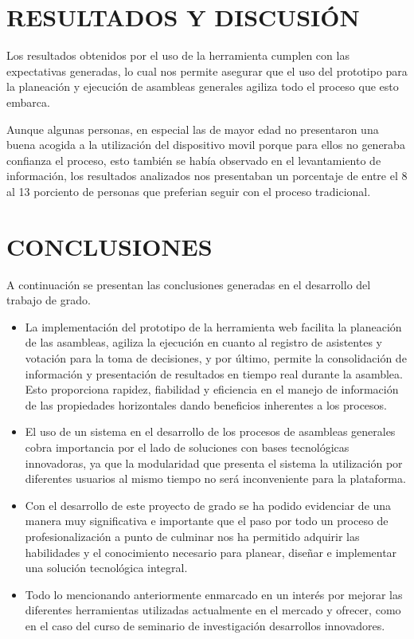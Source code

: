 \chapter{RESULTADOS Y DISCUSIÓN}

Los resultados obtenidos por el uso de la herramienta cumplen con las expectativas generadas, lo cual nos permite asegurar que el uso del prototipo para la planeación y ejecución de asambleas generales agiliza todo el proceso que esto embarca.

\vspace{0.5cm}

Aunque algunas personas, en especial las de mayor edad no presentaron una buena acogida a la utilización del dispositivo movil porque para ellos no generaba confianza el proceso, esto también se había observado en el levantamiento de información, los resultados analizados nos presentaban un porcentaje de entre el 8 al 13 porciento de personas que preferian seguir con el proceso tradicional.

\chapter{CONCLUSIONES}

A continuación se presentan las conclusiones generadas en el desarrollo del trabajo de grado.

\begin{itemize}
	\item La implementación del prototipo de la herramienta web facilita la planeación de las asambleas, agiliza la ejecución en cuanto al registro de asistentes y votación para la toma de decisiones, y por último, permite la consolidación de información y presentación de resultados en tiempo real durante la asamblea. Esto proporciona rapidez, fiabilidad y eficiencia en el manejo de información de las propiedades horizontales dando beneficios inherentes a los procesos.	
	\item El uso de un sistema en el desarrollo de los procesos de asambleas generales cobra importancia por el lado de soluciones con bases tecnológicas innovadoras, ya que la modularidad que presenta el sistema la utilización por diferentes usuarios al mismo tiempo no será inconveniente para la plataforma.	
	\item Con el desarrollo de este proyecto de grado se ha podido evidenciar de una manera muy significativa e importante que el paso por todo un proceso de profesionalización a punto de culminar nos ha permitido adquirir las habilidades y el conocimiento necesario para planear, diseñar e implementar una solución tecnológica integral.	
	\item Todo lo mencionando anteriormente enmarcado en un interés por mejorar las diferentes herramientas utilizadas actualmente en el mercado y ofrecer, como en el caso del curso de seminario de investigación desarrollos innovadores.
\end{itemize}

